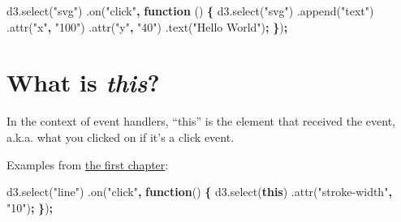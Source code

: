 \documentclass[openany]{book}
\newenvironment{Shaded}{\begin{snugshade}}{\end{snugshade}}
\newcommand{\AttributeTok}[1]{\textcolor[rgb]{0.77,0.63,0.00}{#1}}
\newcommand{\KeywordTok}[1]{\textcolor[rgb]{0.13,0.29,0.53}{\textbf{#1}}}
\newcommand{\NormalTok}[1]{#1}
\newcommand{\OperatorTok}[1]{\textcolor[rgb]{0.81,0.36,0.00}{\textbf{#1}}}
\newcommand{\StringTok}[1]{\textcolor[rgb]{0.31,0.60,0.02}{#1}}
\newcommand{\VariableTok}[1]{\textcolor[rgb]{0.00,0.00,0.00}{#1}}
\begin{document}
\begin{Shaded}
\begin{Highlighting}[]
\VariableTok{d3}\NormalTok{.}\AttributeTok{select}\NormalTok{(}\StringTok{"svg"}\NormalTok{)}
\NormalTok{  .}\AttributeTok{on}\NormalTok{(}\StringTok{"click"}\OperatorTok{,} \KeywordTok{function}\NormalTok{ () }\OperatorTok{\{}
    \VariableTok{d3}\NormalTok{.}\AttributeTok{select}\NormalTok{(}\StringTok{"svg"}\NormalTok{)}
\NormalTok{      .}\AttributeTok{append}\NormalTok{(}\StringTok{"text"}\NormalTok{)}
\NormalTok{        .}\AttributeTok{attr}\NormalTok{(}\StringTok{"x"}\OperatorTok{,} \StringTok{"100"}\NormalTok{)}
\NormalTok{        .}\AttributeTok{attr}\NormalTok{(}\StringTok{"y"}\OperatorTok{,} \StringTok{"40"}\NormalTok{)}
\NormalTok{        .}\AttributeTok{text}\NormalTok{(}\StringTok{"Hello World"}\NormalTok{)}\OperatorTok{;}
        \OperatorTok{\}}\NormalTok{)}\OperatorTok{;}
\end{Highlighting}
\end{Shaded}

\hypertarget{what-is-this}{%
\section{\texorpdfstring{What is \emph{this}?}{What is this?}}\label{what-is-this}}

In the context of event handlers, ``this'' is the element that received the event, a.k.a. what you clicked on if it's a click event.

Examples from \href{jump.html\#interactivity}{the first chapter}:

\begin{Shaded}
\begin{Highlighting}[]
\VariableTok{d3}\NormalTok{.}\AttributeTok{select}\NormalTok{(}\StringTok{"line"}\NormalTok{)}
\NormalTok{  .}\AttributeTok{on}\NormalTok{(}\StringTok{"click"}\OperatorTok{,} \KeywordTok{function}\NormalTok{() }\OperatorTok{\{}
    \VariableTok{d3}\NormalTok{.}\AttributeTok{select}\NormalTok{(}\KeywordTok{this}\NormalTok{)}
\NormalTok{      .}\AttributeTok{attr}\NormalTok{(}\StringTok{"stroke-width"}\OperatorTok{,} \StringTok{"10"}\NormalTok{)}\OperatorTok{;}
      \OperatorTok{\}}\NormalTok{)}\OperatorTok{;}
\end{Highlighting}
\end{Shaded}
\end{document}
